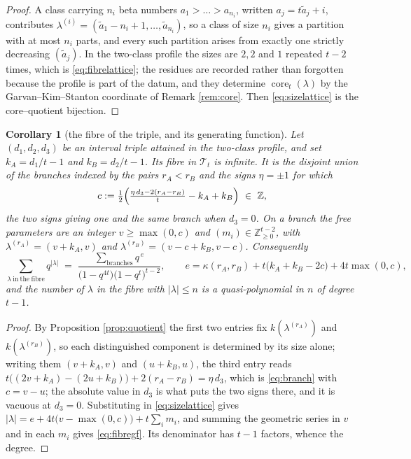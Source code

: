 \documentclass[11pt,reqno]{amsart}
\theoremstyle{plain}
\newtheorem{corollary}[theorem]{Corollary}
\theoremstyle{definition}
\newcommand{\ZZ}{\mathbb{Z}}
\newcommand{\core}{\operatorname{core}}
\begin{document}
\begin{proof}
A class carrying $n_i$ beta numbers $a_1>\dots>a_{n_i}$, written $a_j=t\tilde a_j+i$, contributes
$\lambda^{(i)}=(\tilde a_1-n_i+1,\dots,\tilde a_{n_i})$, so a class of size $n_i$ gives a partition
with at most $n_i$ parts, and every such partition arises from exactly one strictly decreasing
$(\tilde a_j)$. In the two-class profile the sizes are $2,2$ and $1$ repeated $t-2$ times, which is
\eqref{eq:fibrelattice}; the residues are recorded rather than forgotten because the profile is part
of the datum, and they determine $\core_t(\lambda)$ by the Garvan--Kim--Stanton coordinate of
Remark \ref{rem:core}. Then \eqref{eq:sizelattice} is the core--quotient bijection.
\end{proof}

\begin{corollary}[the fibre of the triple, and its generating function]\label{cor:fibregf}
Let $(d_1,d_2,d_3)$ be an interval triple attained in the two-class profile, and set
$k_A=d_1/t-1$ and $k_B=d_2/t-1$. Its fibre in $\mathcal{T}_t$ is infinite. It is the disjoint union
of the branches indexed by the pairs $r_A<r_B$ and the signs $\eta=\pm1$ for which
\begin{equation}\label{eq:branch}
c:=\tfrac12\Bigl(\tfrac{\eta\,d_3-2(r_A-r_B)}{t}-k_A+k_B\Bigr)\ \in\ \ZZ ,
\end{equation}
the two signs giving one and the same branch when $d_3=0$. On a branch the free parameters are an
integer $v\ge\max(0,c)$ and $(m_i)\in\ZZ_{\ge0}^{t-2}$, with $\lambda^{(r_A)}=(v+k_A,v)$ and
$\lambda^{(r_B)}=(v-c+k_B,v-c)$. Consequently
\begin{equation}\label{eq:fibregf}
\sum_{\lambda\ \mathrm{in\ the\ fibre}}\!\!q^{|\lambda|}
\;=\;\frac{\sum_{\mathrm{branches}}q^{\,e}}{\bigl(1-q^{4t}\bigr)\bigl(1-q^{t}\bigr)^{t-2}},
\qquad e=\kappa(r_A,r_B)+t\bigl(k_A+k_B-2c\bigr)+4t\max(0,c),
\end{equation}
and the number of $\lambda$ in the fibre with $|\lambda|\le n$ is a quasi-polynomial in $n$ of
degree $t-1$.
\end{corollary}

\begin{proof}
By Proposition \ref{prop:quotient} the first two entries fix $k(\lambda^{(r_A)})$ and
$k(\lambda^{(r_B)})$, so each distinguished component is determined by its size alone; writing them
$(v+k_A,v)$ and $(u+k_B,u)$, the third entry reads
$t\bigl((2v+k_A)-(2u+k_B)\bigr)+2(r_A-r_B)=\eta\,d_3$, which is \eqref{eq:branch} with $c=v-u$; the
absolute value in $d_3$ is what puts the two signs there, and it is vacuous at $d_3=0$.
Substituting in \eqref{eq:sizelattice} gives $|\lambda|=e+4t\bigl(v-\max(0,c)\bigr)+t\sum_i m_i$, and
summing the geometric series in $v$ and in each $m_i$ gives \eqref{eq:fibregf}. Its denominator has
$t-1$ factors, whence the degree.
\end{proof}
\end{document}
